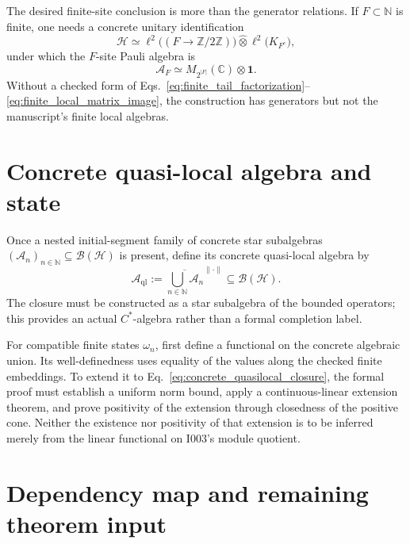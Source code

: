 \documentclass[11pt,reqno]{amsart}
\numberwithin{equation}{section}
\theoremstyle{definition}
\theoremstyle{remark}
\newcommand{\cA}{\mathcal A}
\newcommand{\cH}{\mathcal H}
\newcommand{\cB}{\mathcal B}
\newcommand{\bbC}{\mathbb C}
\newcommand{\id}{\mathbf 1}
\begin{document}
The desired finite-site conclusion is more than the generator relations.  If
$F\subset\mathbb N$ is finite, one needs a concrete unitary identification
\begin{equation}
  \cH\simeq
  \ell^2\bigl((F\to\mathbb Z/2\mathbb Z)\bigr)
  \mathbin{\widehat\otimes}
  \ell^2\bigl(K_{F^c}\bigr),
  \label{eq:finite_tail_factorization}
\end{equation}
under which the $F$-site Pauli algebra is
\begin{equation}
  \cA_F\simeq M_{2^{\lvert F\rvert}}(\bbC)\otimes\id.
  \label{eq:finite_local_matrix_image}
\end{equation}
Without a checked form of Eqs.~\eqref{eq:finite_tail_factorization}--
\eqref{eq:finite_local_matrix_image}, the construction has generators but
not the manuscript's finite local algebras.

\section{Concrete quasi-local algebra and state}
\label{sec:closure_state}

Once a nested initial-segment family of concrete star subalgebras
$(\cA_n)_{n\in\mathbb N}\subseteq\cB(\cH)$ is present, define its concrete
quasi-local algebra by
\begin{equation}
  \cA_{\mathrm{ql}}
  :=\overline{\bigcup_{n\in\mathbb N}\cA_n}^{\|\cdot\|}
  \subseteq\cB(\cH).
  \label{eq:concrete_quasilocal_closure}
\end{equation}
The closure must be constructed as a star subalgebra of the bounded operators;
this provides an actual $C^*$-algebra rather than a formal completion label.

For compatible finite states $\omega_n$, first define a functional on the
concrete algebraic union.  Its well-definedness uses equality of the values
along the checked finite embeddings.  To extend it to
Eq.~\eqref{eq:concrete_quasilocal_closure}, the formal proof must establish a
uniform norm bound, apply a continuous-linear extension theorem, and prove
positivity of the extension through closedness of the positive cone.  Neither
the existence nor positivity of that extension is to be inferred merely from
the linear functional on I003's module quotient.

\section{Dependency map and remaining theorem input}
\label{sec:dependency_map}
\end{document}
